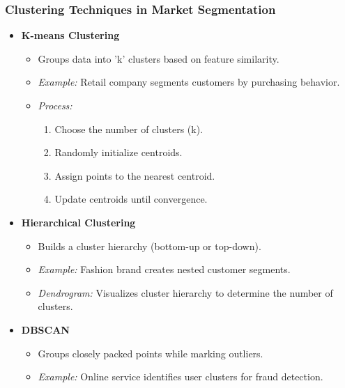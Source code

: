 \documentclass[aspectratio=169]{beamer}
\begin{document}
\begin{frame}[fragile]
    \frametitle{Clustering Techniques in Market Segmentation}
    \begin{itemize}
        \item \textbf{K-means Clustering}
            \begin{itemize}
                \item Groups data into 'k' clusters based on feature similarity.
                \item \textit{Example:} Retail company segments customers by purchasing behavior.
                \item \textit{Process:}
                    \begin{enumerate}
                        \item Choose the number of clusters (k).
                        \item Randomly initialize centroids.
                        \item Assign points to the nearest centroid.
                        \item Update centroids until convergence.
                    \end{enumerate}
            \end{itemize}

        \item \textbf{Hierarchical Clustering}
            \begin{itemize}
                \item Builds a cluster hierarchy (bottom-up or top-down).
                \item \textit{Example:} Fashion brand creates nested customer segments.
                \item \textit{Dendrogram:} Visualizes cluster hierarchy to determine the number of clusters.
            \end{itemize}

        \item \textbf{DBSCAN}
            \begin{itemize}
                \item Groups closely packed points while marking outliers.
                \item \textit{Example:} Online service identifies user clusters for fraud detection.
            \end{itemize}
    \end{itemize}
\end{frame}
\end{document}
